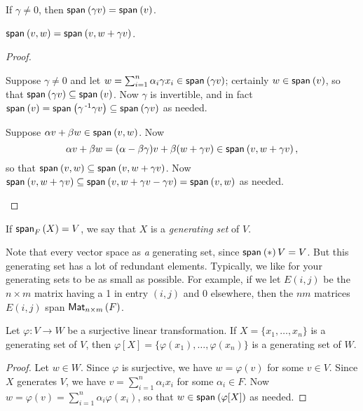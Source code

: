 \documentclass{memoir}
\begin{document}
\begin{prp} \mbox{}
\begin{enumerate*}
\item If $\gamma \neq 0$, then $\Span{\gamma v} = \Span{v}$.
\item $\Span{v,w} = \Span{v,w+\gamma v}$.
\end{enumerate*}
\end{prp}

\begin{proof} \mbox{}
\begin{enumerate*}
\item Suppose $\gamma \neq 0$ and let $w = \sum_{i=1}^n \alpha_i \gamma x_i \in \Span{\gamma v}$; certainly $w \in \Span{v}$, so that $\Span{\gamma v} \subseteq \Span{v}$. Now $\gamma$ is invertible, and in fact $\Span{v} = \Span{\gamma^\inv \gamma v} \subseteq \Span{\gamma v}$ as needed.
\item Suppose $\alpha v + \beta w \in \Span{v,w}$. Now \[\alpha v + \beta w = (\alpha - \beta \gamma) v + \beta(w + \gamma v) \in \Span{v,w+\gamma v}, \] so that $\Span{v,w} \subseteq \Span{v,w+\gamma v}$. Now $\Span{v,w+\gamma v} \subseteq \Span{v,w+\gamma v - \gamma v} = \Span{v,w}$ as needed. \qedhere
\end{enumerate*}
\end{proof}

\begin{dfn}
If $\Span[F]{X} = V$, we say that $X$ is a \emph{generating set} of $V$.
\end{dfn}

Note that every vector space as \emph{a} generating set, since $\Span*{V} = V$. But this generating set has a lot of redundant elements. Typically, we like for your generating sets to be as small as possible. For example, if we let $E(i,j)$ be the $n \times m$ matrix having a 1 in entry $(i,j)$ and 0 elsewhere, then the $nm$ matrices $E(i,j)$ span $\Mat{n}{m}{F}$.

\begin{prp}
Let $\varphi : V \rightarrow W$ be a surjective linear transformation. If $X = \{x_1, \ldots, x_n\}$ is a generating set of $V$, then $\varphi[X] = \{\varphi(x_1), \ldots, \varphi(x_n)\}$ is a generating set of $W$.
\end{prp}

\begin{proof}
Let $w \in W$. Since $\varphi$ is surjective, we have $w = \varphi(v)$ for some $v \in V$. Since $X$ generates $V$, we have $v = \sum_{i=1}^n \alpha_i x_i$ for some $\alpha_i \in F$. Now $w = \varphi(v) = \sum_{i=1}^n \alpha_i \varphi(x_i)$, so that $w \in \Span{\varphi[X]}$ as needed.
\end{proof}
\end{document}
